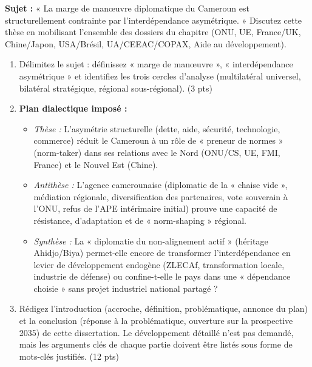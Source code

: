\documentclass[11pt]{article}
\begin{document}
\begin{exercice}
\textbf{Sujet :} « La marge de manœuvre diplomatique du Cameroun est structurellement contrainte par l'interdépendance asymétrique. » Discutez cette thèse en mobilisant l'ensemble des dossiers du chapitre (ONU, UE, France/UK, Chine/Japon, USA/Brésil, UA/CEEAC/COPAX, Aide au développement).
\begin{enumerate}
    \item Délimitez le sujet : définissez « marge de manœuvre », « interdépendance asymétrique » et identifiez les trois cercles d'analyse (multilatéral universel, bilatéral stratégique, régional sous-régional). (3 pts)
    \item \textbf{Plan dialectique imposé :}
    \begin{itemize}
        \item \textit{Thèse :} L'asymétrie structurelle (dette, aide, sécurité, technologie, commerce) réduit le Cameroun à un rôle de « preneur de normes » (norm-taker) dans ses relations avec le Nord (ONU/CS, UE, FMI, France) et le Nouvel Est (Chine).
        \item \textit{Antithèse :} L'agence camerounaise (diplomatie de la « chaise vide », médiation régionale, diversification des partenaires, vote souverain à l'ONU, refus de l'APE intérimaire initial) prouve une capacité de résistance, d'adaptation et de « norm-shaping » régional.
        \item \textit{Synthèse :} La « diplomatie du non-alignement actif » (héritage Ahidjo/Biya) permet-elle encore de transformer l'interdépendance en levier de développement endogène (ZLECAf, transformation locale, industrie de défense) ou confine-t-elle le pays dans une « dépendance choisie » sans projet industriel national partagé ?
    \end{itemize}
    \item Rédigez l'introduction (accroche, définition, problématique, annonce du plan) et la conclusion (réponse à la problématique, ouverture sur la prospective 2035) de cette dissertation. Le développement détaillé n'est pas demandé, mais les arguments clés de chaque partie doivent être listés sous forme de mots-clés justifiés. (12 pts)
\end{enumerate}
\end{exercice}
\end{document}
